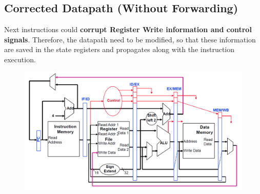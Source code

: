 \documentclass[12pt]{article}
\theoremstyle{definition}
\begin{document}
\subsection{Corrected Datapath (Without Forwarding)}
Next instructions could \textbf{corrupt Register Write information and control signals}. Therefore, the datapath need to be modified, so that these information are saved in the state registers and propagates along with the instruction execution.
\clearpage
\begin{figure}[h]
\centering
\includegraphics[width = \textwidth]{13_3.png}
\end{figure}
\end{document}

